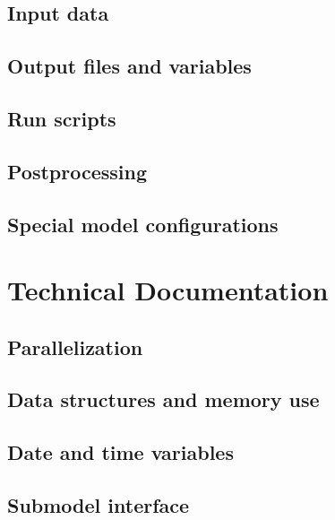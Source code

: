 \documentclass[12pt,a4paper]{book}
\begin{document}
  \section{Input data}\label{secinputfiles}
     

  \section{Output files and variables}\label{secoutputfiles}
     

  \section{Run scripts}\label{secrunscripts}
     

  \section{Postprocessing}\label{secpostprocessing}
     

  \section{Special model configurations}
     

\chapter{Technical Documentation}\label{captechguide}
  \section{Parallelization}
     

  \section{Data structures and memory use}\label{secstreams}

     

  \section{Date and time variables}
     

  \section{Submodel interface}
     


  

  
  

\printindex
\end{document}
